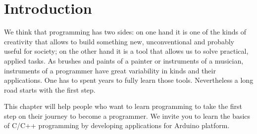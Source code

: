 \documentclass[../sparc.tex]{subfiles}
\begin{document}
\section{Introduction}

We think that programming has two sides: on one hand it is one of the kinds of
creativity that allows to build something new, unconventional and probably
useful for society; on the other hand it is a tool that allows us to solve
practical, applied tasks.  As brushes and paints of a painter or instruments of
a musician, instruments of a programmer have great variability in kinds and
their applications.  One has to spent years to fully learn those tools.
Nevertheless a long road starts with the first step.

This chapter will help people who want to learn programming to take the first
step on their journey to become a programmer.  We invite you to learn the basics
of C/C++ programming by developing applications for Arduino platform.
\end{document}
